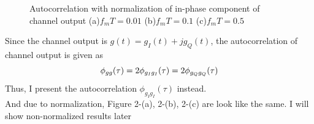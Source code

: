 \documentclass{article}
\begin{document}
\begin{flushleft}
\begin{enumerate}
\newpage
\begin{figure}[H]
\centering
{}
\caption{Autocorrelation with normalization of in-phase component of channel output (a)$f_mT=0.01$ (b)$f_mT=0.1$ (c)$f_mT=0.5$}
\end{figure}
Since the channel output is $g(t)=g_I(t)+jg_Q(t)$, the autocorrelation of channel output is given as
\begin{equation}
\phi_{gg}(\tau)=2\phi_{g_Ig_I}(\tau)=2\phi_{g_Qg_Q}(\tau)\notag
\end{equation}
Thus, I present the autocorrelation $\phi_{g_Ig_I}(\tau)$ instead.\\
And due to normalization, Figure 2-(a), 2-(b), 2-(c) are look like the same. I will show non-normalized results later


\end{enumerate}
\end{flushleft}
\end{document}
